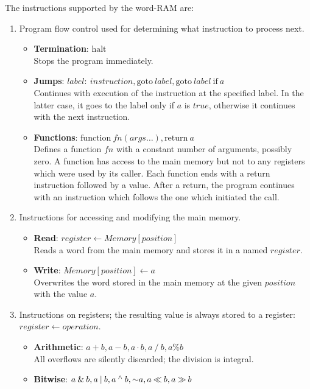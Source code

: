 The instructions supported by the word-RAM are:
\begin{enumerate}
	\item Program flow control used for determining what instruction to process next.
	\begin{itemize}
		\item \textbf{Termination}: $\textrm{halt}$ \\
		Stops the program immediately.
		\item \textbf{Jumps}: $label{:}\ instruction, \textrm{goto}\ label, \textrm{goto}\ label\ \textrm{if}\ a$ \\
		Continues with execution of the instruction at the specified label.
		In the latter case, it goes to the label only if $a$ is $true$, otherwise it continues with the next instruction.
		\item \textbf{Functions}: $\textrm{function}\ fn(args\ldots), \textrm{return}\ a$ \\
		Defines a function $fn$ with a constant number of arguments, possibly zero.
		A function has access to the main memory but not to any registers which were used by its caller.
		Each function ends with a return instruction followed by a value.
		After a return, the program continues with an instruction which follows the one which initiated the call.
	\end{itemize}
	\item Instructions for accessing and modifying the main memory.
	\begin{itemize}
		\item \textbf{Read}: $register \gets Memory[position]$ \\
		Reads a word from the main memory and stores it in a named $register$.
		\item \textbf{Write}: $Memory[position] \gets a$ \\
		Overwrites the word stored in the main memory at the given $position$ with the value $a$.
	\end{itemize}
	\item Instructions on registers; the resulting value is always stored to a register: $register \gets operation$.
	\begin{itemize}
		\item \textbf{Arithmetic}: $a + b, a - b, a \cdot b, a \mathbin{/} b, a \% b$ \\
		All overflows are silently discarded; the division is integral.
		\item \textbf{Bitwise}: $a \mathbin{\&} b, a \mathbin{|} b, a \mathbin{^\wedge} b, \mathord{\sim} a, a \mathbin{\ll} b, a \mathbin{\gg} b$ \\

\end{itemize}
\end{enumerate}
